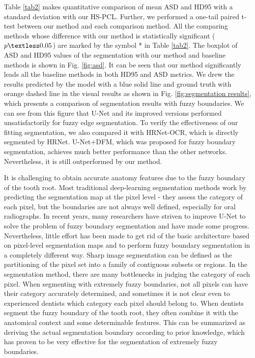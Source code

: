 \documentclass[journal]{IEEEtran}
\begin{document}
\textcolor[rgb]{0,0.541,0.855}{Table \ref{tab2}} makes quantitative comparison of mean ASD and HD95 with a standard deviation with our HS-PCL. Further, we performed a one-tail paired t-test between our method and each comparison method. All the comparing methods whose difference with our method is statistically significant ($p \textless 0.05$) are marked by the symbol * in \textcolor[rgb]{0,0.541,0.855}{Table \ref{tab2}}. The boxplot of ASD and HD95 values of the segmentation with our method and baseline methods is shown in \textcolor[rgb]{0,0.541,0.855}{Fig. \ref{fig:asd}}. It can be seen that our method significantly leads all the baseline methods in both HD95 and ASD metrics. We drew the results predicted by the model with a blue solid line and ground truth with orange dashed line in the visual results as shown in \textcolor[rgb]{0,0.541,0.855}{Fig. \ref{fig:segmentation results}}, which presents a comparison of segmentation results with fuzzy boundaries. We can see from this figure that U-Net and its improved versions performed unsatisfactorily for fuzzy edge segmentation. To verify the effectiveness of our fitting segmentation, we also compared it with HRNet-OCR, which is directly segmented by HRNet. U-Net+DFM, which was proposed for fuzzy boundary segmentation, achieves much better performance than the other networks. Nevertheless, it is still outperformed by our method. 

It is challenging to obtain accurate anatomy features due to the fuzzy boundary of the tooth root. Most traditional deep-learning segmentation methods work by predicting the segmentation map at the pixel level - they assess the category of each pixel, but the boundaries are not always well defined, especially for oral radiographs. In recent years, many researchers have striven to improve U-Net to solve the problem of fuzzy boundary segmentation and have made some progress. Nevertheless, little effort has been made to get rid of the basic architecture based on pixel-level segmentation maps and to perform fuzzy boundary segmentation in a completely different way. Sharp image segmentation can be defined as the partitioning of the pixel set into a family of contiguous subsets or regions. In the segmentation method, there are many bottlenecks in judging the category of each pixel. When segmenting with extremely fuzzy boundaries, not all pixels can have their category accurately determined, and sometimes it is not clear even to experienced dentists which category each pixel should belong to. When dentists segment the fuzzy boundary of the tooth root, they often combine it with the anatomical context and some determinable features. This can be summarized as deriving the actual segmentation boundary according to prior knowledge, which has proven to be very effective for the segmentation of extremely fuzzy boundaries. 
\end{document}
